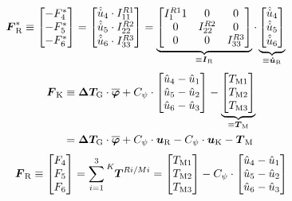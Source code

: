 \begin{equation}
\begin{split}
\boldsymbol{F}^*_{\text{R}} &\equiv \begin{bmatrix}-F^*_{\text{4}} \\ -F^*_{\text{5}} \\ -F^*_{\text{6}} \end{bmatrix} = 
\begin{bmatrix}
\hat{\dot{u}}_{\text{4}} \cdot I^{R1}_{\text{11}} \\ \hat{\dot{u}}_{\text{5}}\cdot I^{R2}_{\text{22}} \\ \hat{\dot{u}}_{\text{6}}\cdot I^{R3}_{\text{33}}
\end{bmatrix} = \underbrace{\begin{bmatrix}
I^{R1}_{\text{1}}1 & 0 & 0 \\ 0 & I^{R2}_{\text{22}} & 0 \\ 0 & 0 & I^{R3}_{\text{33}}
\end{bmatrix}}_{\equiv \boldsymbol{I}_{\text{R}}} \cdot \underbrace{\begin{bmatrix}
\hat{\dot{u}}_{\text{4}} \\ \hat{\dot{u}}_{\text{5}} \\ \hat{\dot{u}}_{\text{6}}
\end{bmatrix}}_{\equiv \boldsymbol{\dot{u}}_{\text{R}}}
\end{split}
\end{equation}
\begin{equation}
\begin{split}
\boldsymbol{F}_{\text{K}} &\equiv \boldsymbol{\Delta T_{\text{G}}}\cdot \overline{\boldsymbol{\varphi}} + C_{\psi}\cdot \begin{bmatrix}
\hat{u}_{\text{4}} - \hat{u}_{\text{1}} \\ \hat{u}_{\text{5}} - \hat{u}_{\text{2}} \\ \hat{u}_{\text{6}} - \hat{u}_{\text{3}}
\end{bmatrix} - \underbrace{\begin{bmatrix}
T_{\text{M1}} \\ T_{\text{M2}} \\ T_{\text{M3}}
\end{bmatrix}}_{\equiv \boldsymbol{T}_{\text{M}}}
\\
&= \boldsymbol{\Delta T_{\text{G}}} \cdot \overline{\boldsymbol{\varphi}} + C_{\psi} \cdot \boldsymbol{u}_{\text{R}} - C_{\psi} \cdot \boldsymbol{u}_{\text{K}}  - \boldsymbol{T}_{\text{M}}
\end{split}
\end{equation}
\begin{equation}
\bs{F}\idx{R} \equiv \begin{bmatrix} F\idx4 \\ F\idx5 \\ F\idx6 \end{bmatrix} = \sum^3_{i=1} \presuper{K}{\bs{T}^{Ri/Mi}} = \begin{bmatrix}
T\idx{M1} \\ T\idx{M2} \\ T\idx{M3}
\end{bmatrix} - C_{\psi}\cdot \begin{bmatrix}
\hat{u}\idx4 - \hat{u}\idx1 \\ \hat{u}\idx5 - \hat{u}\idx2 \\ \hat{u}\idx6 - \hat{u}\idx3
\end{bmatrix}
\end{equation}
